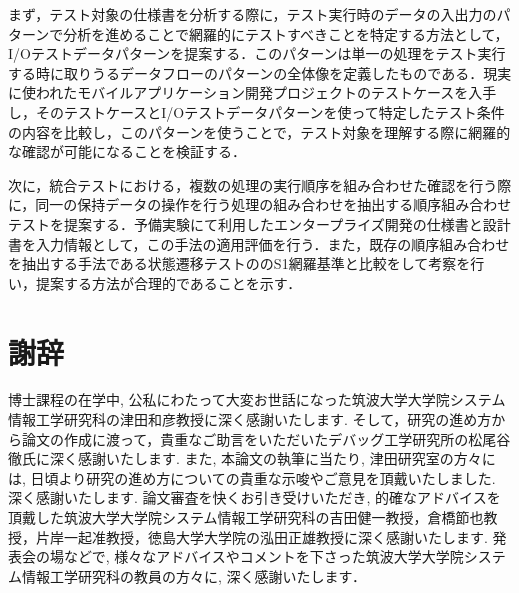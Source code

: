 \documentclass[a4paper,12pt]{jreport}
\begin{document}
まず，テスト対象の仕様書を分析する際に，テスト実行時のデータの入出力のパターンで分析を進めることで網羅的にテストすべきことを特定する方法として，I/Oテストデータパターンを提案する．このパターンは単一の処理をテスト実行する時に取りうるデータフローのパターンの全体像を定義したものである．現実に使われたモバイルアプリケーション開発プロジェクトのテストケースを入手し，そのテストケースとI/Oテストデータパターンを使って特定したテスト条件の内容を比較し，このパターンを使うことで，テスト対象を理解する際に網羅的な確認が可能になることを検証する．

次に，統合テストにおける，複数の処理の実行順序を組み合わせた確認を行う際に，同一の保持データの操作を行う処理の組み合わせを抽出する順序組み合わせテストを提案する．予備実験にて利用したエンタープライズ開発の仕様書と設計書を入力情報として，この手法の適用評価を行う．また，既存の順序組み合わせを抽出する手法である状態遷移テストののS1網羅基準と比較をして考察を行い，提案する方法が合理的であることを示す．
\vspace{0pt plus 1fil}
\newpage

\tableofcontents
\listoffigures
\listoftables

\pagebreak \setcounter{page}{1}








\chapter*{謝辞}
博士課程の在学中, 公私にわたって大変お世話になった筑波大学大学院システム情報工学研究科の津田和彦教授に深く感謝いたします. そして，研究の進め方から論文の作成に渡って，貴重なご助言をいただいたデバッグ工学研究所の松尾谷徹氏に深く感謝いたします.
また, 本論文の執筆に当たり, 津田研究室の方々には, 日頃より研究の進め方についての貴重な示唆やご意見を頂戴いたしました. 深く感謝いたします.
論文審査を快くお引き受けいただき, 的確なアドバイスを頂戴した筑波大学大学院システム情報工学研究科の吉田健一教授，倉橋節也教授，片岸一起准教授，徳島大学大学院の泓田正雄教授に深く感謝いたします.
発表会の場などで, 様々なアドバイスやコメントを下さった筑波大学大学院システム情報工学研究科の教員の方々に, 深く感謝いたします．
\end{document}
